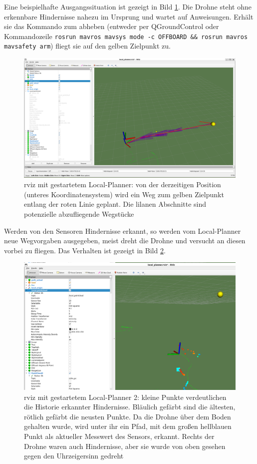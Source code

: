 Eine beispielhafte Ausgangssituation ist gezeigt in Bild \ref{fig:avoid_local_plan_pathing}. Die Drohne steht ohne erkennbare Hindernisse nahezu im Ursprung und wartet auf Anweisungen. Erhält sie das Kommando zum abheben (entweder per QGroundControl oder Kommandozeile \texttt{rosrun mavros mavsys mode -c OFFBOARD \&\& rosrun mavros mavsafety arm}) fliegt sie auf den gelben Zielpunkt zu.

\begin{figure}[!ht]
    \centering
    \includegraphics[width=0.7\linewidth]{images/avoid_local_plan_pathing.png}
    \caption[rviz mit gestartetem Local-Planner]{rviz mit gestartetem Local-Planner: von der derzeitigen Position (unteres Koordinatensystem) wird ein Weg zum gelben Zielpunkt entlang der roten Linie geplant. Die lilanen Abschnitte sind potenzielle abzufliegende Wegstücke}
    \label{fig:avoid_local_plan_pathing}
\end{figure}

Werden von den Sensoren Hindernisse erkannt, so werden vom Local-Planner neue Wegvorgaben ausgegeben, meist dreht die Drohne und versucht an diesen vorbei zu fliegen. Das Verhalten ist gezeigt in Bild \ref{fig:avoid_local_plan_correct}.

\begin{figure}[!ht]
    \centering
    \includegraphics[width=0.7\linewidth]{images/avoid_local_plan_correct.png}
    \caption[rviz mit gestartetem Local-Planner 2]{rviz mit gestartetem Local-Planner 2: kleine Punkte verdeutlichen die Historie erkannter Hindernisse. Bläulich gefärbt sind die ältesten, rötlich gefärbt die neusten Punkte. Da die Drohne über dem Boden gehalten wurde, wird unter ihr ein Pfad, mit dem großen hellblauen Punkt als aktueller Messwert des Sensors, erkannt. Rechts der Drohne waren auch Hindernisse, aber sie wurde von oben gesehen gegen den Uhrzeigersinn gedreht}
    \label{fig:avoid_local_plan_correct}
\end{figure}
